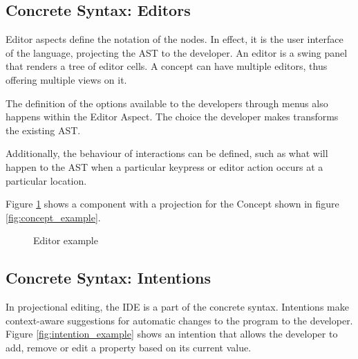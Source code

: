 \subsection{Concrete Syntax: Editors}
Editor aspects define the notation of the nodes.
In effect, it is the user interface of the language, projecting the AST to the developer.
An editor is a swing panel that renders a tree of editor cells.
A concept can have multiple editors, thus offering multiple views on it.

The definition of the options available to the developers through menus also happens within the Editor Aspect. 
The choice the developer makes transforms the existing AST.

Additionally, the behaviour of interactions can be defined, such as what will happen to the AST when a particular keypress or editor action occurs at a particular location.

Figure \ref{fig:editor_example} shows a component with a projection for the Concept shown in figure \ref{fig:concept_example}.

\begin{figure}[h]
    \centering
    \caption{Editor example}
    \label{fig:editor_example}
\end{figure}
 
\subsection{Concrete Syntax: Intentions}
In projectional editing, the IDE is a part of the concrete syntax.
Intentions make context-aware suggestions for automatic changes to the program to the developer.
Figure \ref{fig:intention_example} shows an intention that allows the developer to add, remove or edit a property based on its current value.

